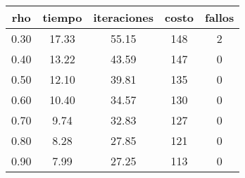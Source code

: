 \begin{table}[h!]
\centering
\begin{tabular}{ccccc}
rho & tiempo & iteraciones & costo & fallos \\ 
\hline 
0.30 & 17.33 & 55.15 & 148 & 2 \\ 
0.40 & 13.22 & 43.59 & 147 & 0 \\ 
0.50 & 12.10 & 39.81 & 135 & 0 \\ 
0.60 & 10.40 & 34.57 & 130 & 0 \\ 
0.70 & 9.74 & 32.83 & 127 & 0 \\ 
0.80 & 8.28 & 27.85 & 121 & 0 \\ 
0.90 & 7.99 & 27.25 & 113 & 0 \\ 
\hline 
\end{tabular}
\end{table}